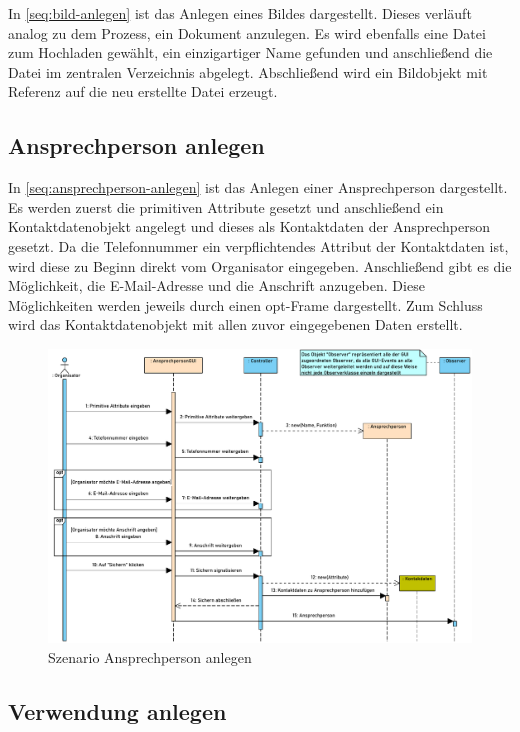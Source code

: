 In \autoref{seq:bild-anlegen} ist das Anlegen eines Bildes dargestellt. Dieses verläuft analog zu dem Prozess, ein Dokument anzulegen. Es wird ebenfalls eine Datei zum Hochladen gewählt, ein einzigartiger Name gefunden und anschließend die Datei im zentralen Verzeichnis abgelegt. Abschließend wird ein Bildobjekt mit Referenz auf die neu erstellte Datei erzeugt.

\FloatBarrier

\subsection{Ansprechperson anlegen}

In \autoref{seq:ansprechperson-anlegen} ist das Anlegen einer Ansprechperson dargestellt. Es werden zuerst die primitiven Attribute gesetzt und anschließend ein Kontaktdatenobjekt angelegt und dieses als Kontaktdaten der Ansprechperson gesetzt. Da die Telefonnummer ein verpflichtendes Attribut der Kontaktdaten ist, wird diese zu Beginn direkt vom Organisator eingegeben. Anschließend gibt es die Möglichkeit, die E-Mail-Adresse und die Anschrift anzugeben. Diese Möglichkeiten werden jeweils durch einen opt-Frame dargestellt. Zum Schluss wird das Kontaktdatenobjekt mit allen zuvor eingegebenen Daten erstellt.

\begin{figure}[ht!]
    \centering
    \includegraphics[width=0.98\columnwidth]{Bilder/seq_Ansprechperson_anlegen.pdf}
    \caption{Szenario Ansprechperson anlegen}
    \label{seq:ansprechperson-anlegen}
\end{figure}

\FloatBarrier

\subsection{Verwendung anlegen}

